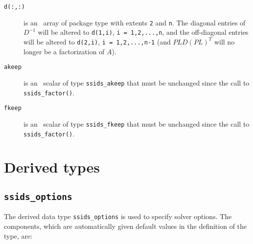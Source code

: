 \documentclass{spral}
\begin{document}
\begin{description}

\item[\texttt{d(:,:)}] is an \intentin\ array of package type with
extents {\tt 2}  and {\tt n}. The diagonal entries
of ${D}^{-1}$ will be altered to {\tt d(1,i)}, {\tt i = 1,2,...,n},
and the off-diagonal entries will be altered to
{\tt d(2,i)}, {\tt i = 1,2,...,n-1} (and $PLD(PL)^T$ will no longer be
a factorization of $A$).

\item[\texttt{akeep}]  is an \intentin\ scalar of type {\tt ssids\_akeep} that
must be unchanged since the call to {\tt ssids\_factor()}.

\item[\texttt{fkeep}]  is an \intentinout\ scalar of type {\tt ssids\_fkeep}
that must be unchanged since the call to {\tt ssids\_factor()}.

\end{description}


\section{Derived types}
\subsection{\texttt{ssids\_options}}
\label{typeoptions}

The derived data type {\tt ssids\_options}
is used to specify solver options. The components, which are automatically
given default values in the definition of the type, are: \\

\end{document}
